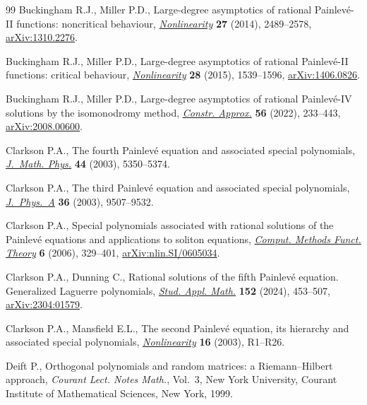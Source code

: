 \begin{thebibliography}{99}
Buckingham R.J., Miller P.D., Large-degree asymptotics of rational
 {P}ainlev\'e-{II} functions: noncritical behaviour,
 \href{https://doi.org/10.1088/0951-7715/27/10/2489}{\textit{Nonlinearity}}
 \textbf{27} (2014), 2489--2578,
 \href{http://arxiv.org/abs/1310.2276}{arXiv:1310.2276}.

Buckingham R.J., Miller P.D., Large-degree asymptotics of rational
 {P}ainlev\'e-{II} functions: critical behaviour,
 \href{https://doi.org/10.1088/0951-7715/28/6/1539}{\textit{Nonlinearity}}
 \textbf{28} (2015), 1539--1596,
 \href{http://arxiv.org/abs/1406.0826}{arXiv:1406.0826}.

Buckingham R.J., Miller P.D., Large-degree asymptotics of rational
 {P}ainlev\'e-{IV} solutions by the isomonodromy method,
 \href{https://doi.org/10.1007/s00365-022-09586-1}{\textit{Constr. Approx.}}
 \textbf{56} (2022), 233--443,
 \href{http://arxiv.org/abs/2008.00600}{arXiv:2008.00600}.

Clarkson P.A., The fourth {P}ainlev\'e equation and associated special
 polynomials, \href{https://doi.org/10.1063/1.1603958}{\textit{J.~Math.
 Phys.}} \textbf{44} (2003), 5350--5374.

Clarkson P.A., The third {P}ainlev\'e equation and associated special
 polynomials,
 \href{https://doi.org/10.1088/0305-4470/36/36/306}{\textit{J.~Phys.~A}}
 \textbf{36} (2003), 9507--9532.

Clarkson P.A., Special polynomials associated with rational solutions of the
 {P}ainlev\'e equations and applications to soliton equations,
 \href{https://doi.org/10.1007/BF03321618}{\textit{Comput. Methods Funct.
 Theory}} \textbf{6} (2006), 329--401,
 \href{http://arxiv.org/abs/nlin.SI/0605034}{arXiv:nlin.SI/0605034}.

Clarkson P.A., Dunning C., Rational solutions of the fifth {P}ainlev\'e
 equation. {G}eneralized {L}aguerre polynomials,
 \href{https://doi.org/10.1111/sapm.12649}{\textit{Stud. Appl. Math.}}
 \textbf{152} (2024), 453--507,
 \href{http://arxiv.org/abs/2304:01579}{arXiv:2304:01579}.

Clarkson P.A., Mansfield E.L., The second {P}ainlev\'e equation, its hierarchy
 and associated special polynomials,
 \href{https://doi.org/10.1088/0951-7715/16/3/201}{\textit{Nonlinearity}}
 \textbf{16} (2003), R1--R26.

Deift P., Orthogonal polynomials and random matrices: a {R}iemann--{H}ilbert
 approach, \textit{Courant Lect. Notes Math.}, Vol.~3, New York University,
 Courant Institute of Mathematical Sciences, New York, 1999.


\end{thebibliography}
